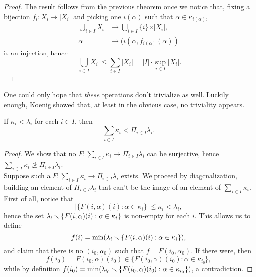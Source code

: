\documentclass[twoside,openright,titlepage,numbers=noenddot,%
               headinclude,footinclude,cleardoublepage=empty,abstract=on,
               BCOR=23mm,paper=letter,fontsize=11pt
               ]{scrreprt}
\begin{document}
\begin{proof}
    The result follows from the previous theorem once we notice that, fixing a bijection $f_i: X_i \to \vert X_i \vert$ and picking one $i(\alpha)$ such that $\alpha \in \kappa_{i(\alpha)}$,
    \begin{align*}
        \bigcup_{i \in I} X_i &\to \bigcup_{i \in I} \{i\} \times \vert X_i \vert, \\
        \alpha &\to (i(\alpha, f_{i(\alpha)}(\alpha))
    \end{align*}
    is an injection, hence
    \[ \vert \bigcup_{i \in I} X_i \vert \leq \sum_{i \in I} \vert X_i \vert = \vert I \vert \cdot \sup_{i \in I} \vert X_i \vert. \]
\end{proof}
One could only hope that \textit{these} operations don't trivialize as well. Luckily enough, Koenig showed that, at least in the obvious case, no triviality appears.
\begin{theorem}[Koenig]
    If $\kappa_i < \lambda_i$ for each $i \in I$, then
    \[ \sum_{i \in I} \kappa_i < \Pi_{i \in I} \lambda_i. \]
\end{theorem}
\begin{proof}
    We show that no $F: \sum_{i \in I} \kappa_i \to \Pi_{i \in I} \lambda_i$ can be surjective, hence $\sum_{i \in I} \kappa_i \not\geq \Pi_{i \in I} \lambda_i$. \\
    Suppose such a $F: \sum_{i \in I} \kappa_i \to \Pi_{i \in I} \lambda_i$ exists. We proceed by diagonalization, building an element of $\Pi_{i \in I} \lambda_i$ that can't be the image of an element of $\sum_{i \in I} \kappa_i$. First of all, notice that
    \[ \vert \{ F(i,\alpha)(i): \alpha \in \kappa_i \} \vert \leq \kappa_i < \lambda_i, \]
    hence the set $\lambda_i \smallsetminus \{F(i,\alpha)(i): \alpha \in \kappa_i\}$ is non-empty for each $i$. This allows us to define
    \[ f(i) = \min(\lambda_i \smallsetminus \{F(i,\alpha)(i): \alpha \in \kappa_i\}), \]
    and claim that there is no $(i_0,\alpha_0)$ such that $f = F(i_0,\alpha_0)$. If there were, then
    \[ f(i_0) = F(i_0,\alpha)(i_0) \in \{F(i_0,\alpha)(i_0): \alpha \in \kappa_{i_0}\}, \]
    while by definition $f(i_0) = \min(\lambda_{i_0} \smallsetminus \{F(i_0,\alpha)(i_0): \alpha \in \kappa_{i_0}\})$, a contradiction.
\end{proof}
\end{document}
